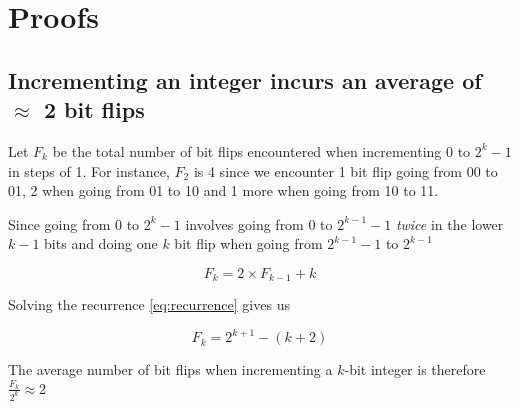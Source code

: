 \chapter{Proofs}

\label{AppendixC}


\section{Incrementing an integer incurs an average of $\approx$ 2 bit flips}
\label{proof:average-2-flips}

Let $F_k$ be the total number of bit flips encountered when
incrementing 0 to $2^k - 1$ in steps of 1.  For instance, $F_2$ is 4
since we encounter 1 bit flip going from 00 to 01, 2 when going from
01 to 10 and 1 more when going from 10 to 11.

Since going from 0 to $2^k - 1$ involves going from 0 to $2^{k - 1} -
1$ \textit{twice} in the lower $k - 1$ bits and doing one $k$ bit flip
when going from $2^{k - 1} - 1$ to $2^{k - 1}$


\begin{equation} \label{eq:recurrence}
  F_k = 2 \times F_{k - 1} + k
\end{equation}

Solving the recurrence \ref{eq:recurrence} gives us

\begin{equation} \label{eq:solved}
  F_k = 2^{k + 1} - (k + 2)
\end{equation}

The average number of bit flips when incrementing a $k$-bit integer is
therefore $\frac{F_k}{2^k} \approx 2$
